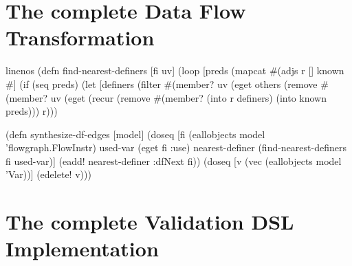 \documentclass[submission]{eptcs}
\begin{document}
\section{The complete Data Flow Transformation}
\label{sec:complete-data-flow}

\begin{clojurecode*}{linenos}
(defn find-nearest-definers [fi uv]
  (loop [preds (mapcat #(adjs %
         r []
         known #{}]
    (if (seq preds)
      (let [definers (filter #(member? uv (eget %
            others   (remove #(member? uv (eget %
        (recur (remove #(member? %
               (into r definers)
               (into known preds)))
      r)))

(defn synthesize-df-edges [model]
  (doseq [fi (eallobjects model 'flowgraph.FlowInstr)
          used-var (eget fi :use)
          nearest-definer (find-nearest-definers fi used-var)]
    (eadd! nearest-definer :dfNext fi))
  (doseq [v (vec (eallobjects model 'Var))]
    (edelete! v)))
\end{clojurecode*}

\section{The complete Validation DSL Implementation}
\label{sec:compl-valid-dsl}
\end{document}
